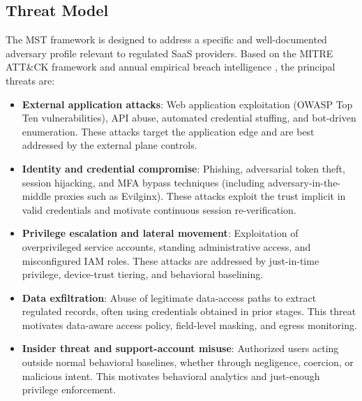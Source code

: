 \documentclass[unnumsec,webpdf,contemporary,large]{oup-authoring-template}
\theoremstyle{thmstyleone}
\theoremstyle{thmstyletwo}
\theoremstyle{thmstylethree}
\begin{document}
\subsection{Threat Model}

The MST framework is designed to address a specific and well-documented adversary profile
relevant to regulated SaaS providers. Based on the MITRE ATT\&CK framework
\cite{strom2018} and annual empirical breach intelligence \cite{verizon2025, crowdstrike2025, ciscotalos2025}, the principal threats are:

\begin{itemize}
\item \textbf{External application attacks}: Web application exploitation (OWASP Top Ten
      vulnerabilities), API abuse, automated credential stuffing, and bot-driven enumeration.
      These attacks target the application edge and are best addressed by the external plane
      controls.

\item \textbf{Identity and credential compromise}: Phishing, adversarial token theft,
      session hijacking, and MFA bypass techniques (including adversary-in-the-middle
      proxies such as Evilginx). These attacks exploit the trust implicit in valid
      credentials and motivate continuous session re-verification.

\item \textbf{Privilege escalation and lateral movement}: Exploitation of overprivileged
      service accounts, standing administrative access, and misconfigured IAM roles.
      These attacks are addressed by just-in-time privilege, device-trust tiering, and
      behavioral baselining.

\item \textbf{Data exfiltration}: Abuse of legitimate data-access paths to extract
      regulated records, often using credentials obtained in prior stages. This threat
      motivates data-aware access policy, field-level masking, and egress monitoring.

\item \textbf{Insider threat and support-account misuse}: Authorized users acting outside
      normal behavioral baselines, whether through negligence, coercion, or malicious intent.
      This motivates behavioral analytics and just-enough privilege enforcement.


\end{itemize}
\end{document}
